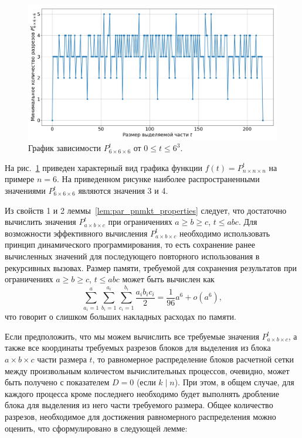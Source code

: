 \begin{figure}[ht]
\centering
\includegraphics[width=1.0\textwidth]{fig/par_min_cuts_for_extract_part_chart.png}
\singlespacing
{}\caption{График зависимости $P_{6 \times 6 \times 6}^t$ от $0 \le t \le 6^3$.}
\label{fig:par_pnmkt_chart}
\end{figure}

На рис.~\ref{fig:par_pnmkt_chart} приведен характерный вид графика функции $f(t) = P_{n \times n \times n}^t$ на примере $n = 6$.
На приведенном рисунке наиболее распространенными значениями $P_{6 \times 6 \times 6}^t$ являются значения 3 и 4.

Из свойств 1 и 2 леммы~\ref{lem:par_pnmkt_properties} следует, что достаточно вычислить значения $P_{a \times b \times c}^t$ при ограничениях $a \ge b \ge c$, $t \le abc$.
Для возможности эффективного вычисления $P_{a \times b \times c}^t$ необходимо использовать принцип динамического программирования, то есть сохранение ранее вычисленных значений для последующего повторного использования в рекурсивных вызовах.
Размер памяти, требуемой для сохранения результатов при ограничениях $a \ge b \ge c$, $t \le abc$ может быть вычислен как
\begin{equation}
	\sum_{a_i = 1}^{a}{ \sum_{b_i = 1}^{a_i}{ \sum_{c_i = 1}^{b_i}{ \frac{a_i b_i c_i}{2} } } } = \frac{1}{96} a^6 + o(a^6),
\end{equation}
что говорит о слишком больших накладных расходах по памяти.

Если предположить, что мы можем вычислить все требуемые значения $P_{a \times b \times c}^t$, а также все координаты требуемых разрезов блоков для выделения из блока $a \times b \times c$ части размера $t$, то равномерное распределение блоков расчетной сетки между произвольным количестом вычислительных процессов, очевидно, может быть получено с показателем $D = 0$ (если $k \mid n$).
При этом, в общем случае, для каждого процесса кроме последнего необходимо будет выполнять дробление блока для выделения из него части требуемого размера.
Общее количество разрезов, необходимое для достижения равномерного распределения можно оценить, что сформулировано в следующей лемме:

